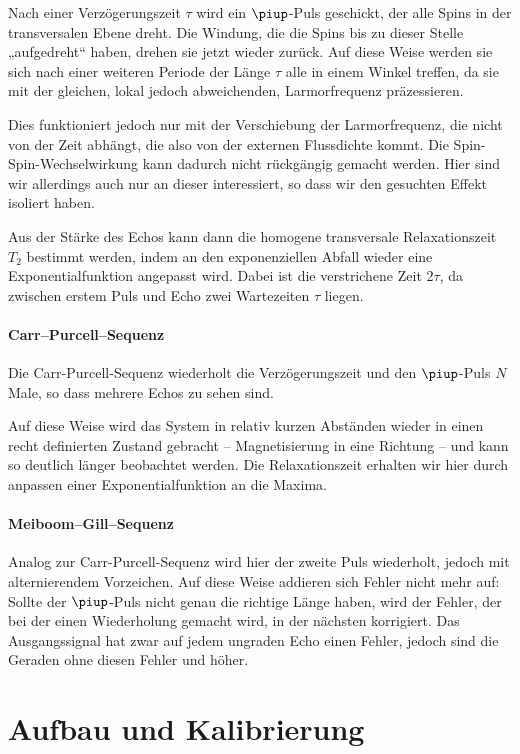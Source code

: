 Nach einer Verzögerungszeit $\tau$ wird ein $\piup$-Puls geschickt, der alle
Spins in der transversalen Ebene dreht. Die Windung, die die Spins bis zu
dieser Stelle „aufgedreht“ haben, drehen sie jetzt wieder zurück. Auf diese
Weise werden sie sich nach einer weiteren Periode der Länge $\tau$ alle in
einem Winkel treffen, da sie mit der gleichen, lokal jedoch abweichenden,
Larmorfrequenz präzessieren.

Dies funktioniert jedoch nur mit der Verschiebung der Larmorfrequenz, die
nicht von der Zeit abhängt, die also von der externen Flussdichte kommt. Die
Spin-Spin-Wechselwirkung kann dadurch nicht rückgängig gemacht werden. Hier
sind wir allerdings auch nur an dieser interessiert, so dass wir den
gesuchten Effekt isoliert haben.

Aus der Stärke des Echos kann dann die homogene transversale
Relaxationszeit $T_2$ bestimmt werden, indem an den exponenziellen Abfall
wieder eine Exponentialfunktion angepasst wird. Dabei ist die verstrichene
Zeit $2 \tau$, da zwischen erstem Puls und Echo zwei Wartezeiten $\tau$
liegen.

\subsubsection{Carr–Purcell–Sequenz}

Die Carr-Purcell-Sequenz wiederholt die Verzögerungszeit und den
$\piup$-Puls $N$ Male, so dass mehrere Echos zu sehen sind.

Auf diese Weise wird das System in relativ kurzen Abständen wieder in einen
recht definierten Zustand gebracht – Magnetisierung in eine Richtung – und
kann so deutlich länger beobachtet werden. Die Relaxationszeit erhalten wir
hier durch anpassen einer Exponentialfunktion an die Maxima.

\subsubsection{Meiboom–Gill–Sequenz}

Analog zur Carr-Purcell-Sequenz wird hier der zweite Puls wiederholt,
jedoch mit alternierendem Vorzeichen. Auf diese Weise addieren sich Fehler
nicht mehr auf: Sollte der $\piup$-Puls nicht genau die richtige Länge
haben, wird der Fehler, der bei der einen Wiederholung gemacht wird, in der
nächsten korrigiert. Das Ausgangssignal hat zwar auf jedem ungraden Echo
einen Fehler, jedoch sind die Geraden ohne diesen Fehler und höher.

\chapter{Aufbau und Kalibrierung}
